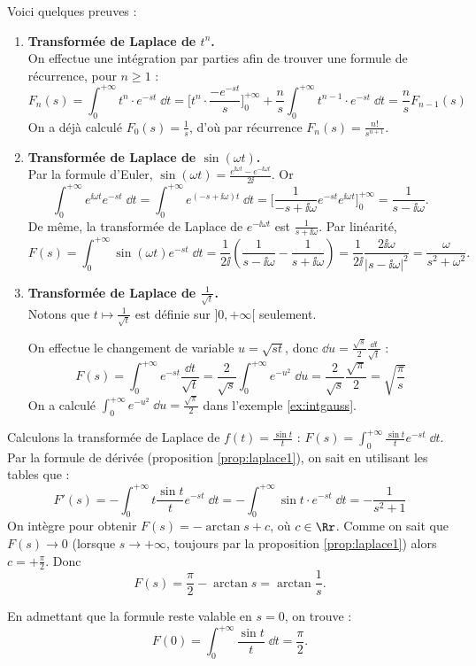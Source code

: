 \documentclass[class=report,crop=false]{standalone}
\begin{document}
Voici quelques preuves :
\begin{enumerate}
  \item \textbf{Transformée de Laplace de $t^n$.}\\
  On effectue une intégration par parties afin de trouver une formule de récurrence, 
  pour $n\ge1$ :
  $$F_{n}(s) = \int_0^{+\infty} t^{n} \cdot e^{-st}\;\dd t
  = \Big[ t^{n} \cdot \frac{-e^{-st}}{s} \Big]_0^{+\infty} 
  +\frac{n}{s} \int_0^{+\infty}  t^{n-1}  \cdot e^{-st}\;\dd t
  = \frac{n}{s}F_{n-1}(s)$$
  On a déjà calculé $F_0(s) = \frac1s$, d'où par récurrence
  $F_{n}(s)=\frac{n!}{s^{n+1}}$.
  
  \item \textbf{Transformée de Laplace de $\sin(\omega t)$.}\\  
  Par la formule d'Euler, $\sin(\omega t) = \frac{e^{\ii\omega t}-e^{-\ii\omega t}} {2\ii}$.
  Or 
  $$\int_0^{+\infty} e^{\ii\omega t}e^{-st}\;\dd t
  = \int_0^{+\infty} e^{(-s+\ii\omega)t}\;\dd t
  = \Big[ \frac1{-s+\ii\omega}e^{-st}e^{\ii\omega t} \Big]_0^{+\infty} 
  = \frac1{s-\ii\omega}.$$
  De même, la transformée de Laplace de $e^{-\ii\omega t}$
  est $\frac1{s+\ii\omega}$.
  Par linéarité, 
  $$F(s)
  = \int_0^{+\infty} \sin(\omega t)e^{-st}\;\dd t
  = \frac{1}{2\ii} \left(\frac1{s-\ii\omega}-\frac1{s+\ii\omega} \right) 
  = \frac{1}{2\ii} \frac{2\ii\omega}{|s-\ii \omega|^2}
  = \frac{\omega}{s^2+\omega^2}.$$
  
  \item \textbf{Transformée de Laplace de $\frac{1}{\sqrt t}$.}\\ 
  Notons que $t\mapsto \frac{1}{\sqrt t}$ est définie sur $]0,+\infty[$ seulement.
  
  On effectue le changement de variable $u= \sqrt{st}$, donc 
  $\dd u = \frac{\sqrt{s}}{2} \frac{\dd t}{\sqrt{t}}$ :
  $$F(s) 
  = \int_0^{+\infty} e^{-st}\frac{\dd t}{\sqrt t}
  = \frac{2}{\sqrt{s}}\int_0^{+\infty} e^{-u^2}\;\dd u
  = \frac{2}{\sqrt{s}}\frac{\sqrt{\pi}}{2}
  = \sqrt{\frac{\pi}{s}}$$
  On a calculé $\int_0^{+\infty} e^{-u^2}\;\dd u = \frac{\sqrt{\pi}}{2}$
  dans l'exemple \ref{ex:intgauss}.
\end{enumerate}

\begin{exemple}
Calculons la transformée de Laplace de $f(t) = \frac{\sin t}{t}$ :
$F(s) = \int_{0}^{+\infty} \frac{\sin t}{t} e^{-st}\;\dd t$.
Par la formule de dérivée (proposition \ref{prop:laplace1}), 
on sait en utilisant les tables que :
$$F'(s) 
= - \int_{0}^{+\infty} t \frac{\sin t}{t} e^{-st}\;\dd t
= - \int_{0}^{+\infty} \sin t \cdot e^{-st}\;\dd t
= - \frac{1}{s^2+1}$$
On intègre pour obtenir $F(s) = -\arctan s + c$, où $c \in \Rr$.
Comme on sait que $F(s) \to 0$ (lorsque $s\to +\infty$, 
toujours par la proposition \ref{prop:laplace1}) alors $c=+\frac\pi2$.
Donc 
$$F(s) = \frac\pi2 - \arctan s = \arctan \frac 1s.$$

En admettant que la formule reste valable en $s=0$, on trouve :
$$F(0) = \int_{0}^{+\infty} \frac{\sin t}{t} \;\dd t = \frac\pi2.$$
\end{exemple}
\end{document}
